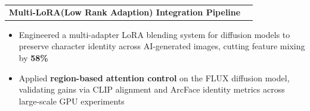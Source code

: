 \documentclass[10pt, letterpaper]{article}
\newenvironment{highlights}{
    \begin{itemize}[
        topsep=0.06 cm,
        parsep=0.06 cm,
        partopsep=0pt,
        itemsep=0pt,
        leftmargin=0 cm + 10pt
    ]
}{
    \end{itemize}
}
\newenvironment{onecolentry}{
    \par\noindent
}{
    \par
}
\begin{document}
\begin{tabularx}{\textwidth}{@{}Xr@{}}
    \textbf{Multi-LoRA(Low Rank Adaption) Integration Pipeline}\\
\end{tabularx}
\vspace{-4.5mm}
\begin{onecolentry}
    \begin{highlights}
\item[--] Engineered a multi-adapter LoRA blending system for diffusion models to preserve character identity across AI-generated images, cutting feature mixing by \textbf{58\%}
\item[--] Applied \textbf{region-based attention control} on the FLUX diffusion model, validating gains via CLIP alignment and ArcFace identity metrics across large-scale GPU experiments
    \end{highlights}
\end{onecolentry}


\end{document}
